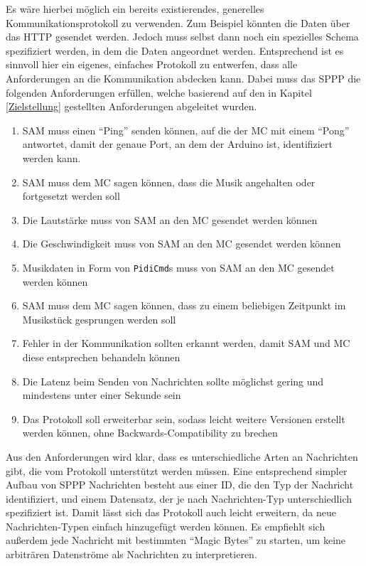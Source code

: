 Es wäre hierbei möglich ein bereits existierendes, generelles Kommunikationsprotokoll zu verwenden.
Zum Beispiel könnten die Daten über das \ac{HTTP} gesendet werden.
Jedoch muss selbst dann noch ein spezielles Schema spezifiziert werden, in dem die Daten angeordnet werden.
Entsprechend ist es sinnvoll hier ein eigenes, einfaches Protokoll zu entwerfen, dass alle Anforderungen an die Kommunikation abdecken kann.
Dabei muss das \ac{SPPP} die folgenden Anforderungen erfüllen, welche basierend auf den in Kapitel \ref{Zielstellung} gestellten Anforderungen abgeleitet wurden.

\begin{enumerate}
    \item \ac{SAM} muss einen \enquote{Ping} senden können, auf die der \ac{MC} mit einem \enquote{Pong} antwortet, damit der genaue Port, an dem der Arduino ist, identifiziert werden kann.
    \item \ac{SAM} muss dem \ac{MC} sagen können, dass die Musik angehalten oder fortgesetzt werden soll
    \item Die Lautstärke muss von \ac{SAM} an den \ac{MC} gesendet werden können
    \item Die Geschwindigkeit muss von \ac{SAM} an den \ac{MC} gesendet werden können
    \item Musikdaten in Form von \lstinline|PidiCmd|s muss von \ac{SAM} an den \ac{MC} gesendet werden können
    \item \ac{SAM} muss dem \ac{MC} sagen können, dass zu einem beliebigen Zeitpunkt im Musikstück gesprungen werden soll
    \item Fehler in der Kommunikation sollten erkannt werden, damit \ac{SAM} und \ac{MC} diese entsprechen behandeln können
    \item Die Latenz beim Senden von Nachrichten sollte möglichst gering und mindestens unter einer Sekunde sein
    \item Das Protokoll soll erweiterbar sein, sodass leicht weitere Versionen erstellt werden können, ohne Backwards-Compatibility zu brechen
\end{enumerate}

Aus den Anforderungen wird klar, dass es unterschiedliche Arten an Nachrichten gibt, die vom Protokoll unterstützt werden müssen.
Eine entsprechend simpler Aufbau von \ac{SPPP} Nachrichten besteht aus einer ID, die den Typ der Nachricht identifiziert, und einem Datensatz, der je nach Nachrichten-Typ unterschiedlich spezifiziert ist.
Damit lässt sich das Protokoll auch leicht erweitern, da neue Nachrichten-Typen einfach hinzugefügt werden können.
Es empfiehlt sich außerdem jede Nachricht mit bestimmten \enquote{Magic Bytes} zu starten, um keine arbiträren Datenströme als Nachrichten zu interpretieren.

